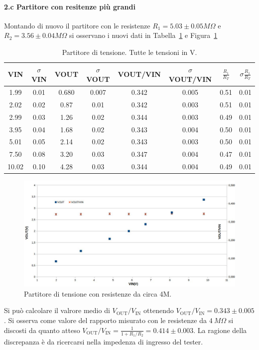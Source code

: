 \documentclass[10pt,a4paper]{article}
\begin{document}
\paragraph{2.c Partitore con resitenze pi\`u grandi}
Montando di nuovo il partitore con le resistenze $R_1 = 5.03\pm 0.05 M\Omega$ e $R_2 = 3.56\pm 0.04 M\Omega$ si osservano i nuovi dati in Tabella~\ref{t:par2} e Figura~\ref{f:par2}
\begin{table}[h]
\centering
\begin{tabular}{|c|c|c|c|c|c|c|c}
\hline 
VIN& $\sigma$ VIN  &VOUT	 & $\sigma$ VOUT& VOUT/VIN & $\sigma$ VOUT/VIN& $\frac{R_{1}}{R_{T}}$ & $\sigma \frac{R_{1}}{R_{T}}$ \\
\hline 

1.99&0.01&0.680&0.007&0.342&0.005&0.51&0.01\\
2.02&0.02&0.87&0.01&0.342&0.003&0.51&0.01\\
2.99&0.03&1.26&0.02&0.344&0.003&0.49&0.01\\
3.95&0.04&1.68&0.02&0.343&0.004&0.50&0.01\\
5.01&0.05&2.14&0.02&0.343&0.003&0.50&0.01\\
7.50&0.08&3.20&0.03&0.347&0.004&0.47&0.01\\
10.02&0.10&4.28&0.03&0.344&0.004&0.49&0.01\\
\hline 
\end{tabular} 
\caption{Partitore di tensione. Tutte le tensioni in V.\label{t:par2}}
\end{table}
\begin{figure}[h]
\centering
\includegraphics[scale=0.6]{part2.jpg}
\caption{Partitore di tensione con resistenze da circa 4M.\label{f:par2}}
\end{figure}

Si può calcolare il valrore medio di $V_\mathrm{OUT}/V_\mathrm{IN}$ ottenendo $V_\mathrm{OUT}/V_\mathrm{IN} = 0.343 \pm 0.005$.
Si osserva come valore del rapporto misurato con le resistenze da $4~M\Omega$ si discosti da quanto atteso   $V_\mathrm{OUT}/V_\mathrm{IN} = \frac{1}{1+R_1/R_2}= 0.414\pm 0.003 $. La ragione della discrepanza \`e da ricercarsi nella impedenza di ingresso del tester.
\end{document}
